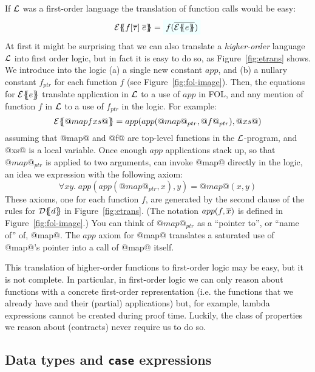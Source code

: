 If $\cal L$ was
a first-order language the translation of function calls would be easy:
$$
\etrans{\Sigma}{\Gamma}{f[\ol{\tau}]\;\ol{e}} = \formula{f(\ol{\etrans{}{}{e}})} \\
$$
At first it might be surprising that we can also translate a \emph{higher-order} language
$\cal L$ into first order logic, but in fact it is easy to do so, as
Figure~\ref{fig:etrans} shows.  We introduce into the logic
(a) a single new constant $app$, and (b) a nullary constant $f_{ptr}$ for each function $f$
(see Figure~\ref{fig:fol-image}).
Then, the equations for ${\cal E}\{\!\!\{e\}\!\!\}$ translate application in $\cal L$ to
a use of $app$ in FOL, and any mention of function $f$ in $\cal L$ to a use
of $f_{ptr}$ in the logic.  For example:
$$
{\cal E}\{\!\!\{@map f xs@\}\!\!\} = app( app( @map@_{ptr}, @f@_{ptr}), @xs@)
$$
assuming that @map@ and @f@ are top-level functions in the $\cal L$-program, and
@xs@ is a local variable.  Once enough $app$ applications stack up, so that
$@map@_{ptr}$ is applied to two arguments, can invoke @map@ directly in the logic,
an idea we expression with the following axiom:
$$
\forall x y.\;app(app(@map@_{ptr}, x), y) = @map@(x,y)
$$
These axioms, one for each function $f$, are generated by the second
clause of the rules for ${\cal D}\{\!\!\{d\}\!\!\}$ in Figure~\ref{fig:etrans}.
(The notation $app(f,\overline{x})$ is defined in Figure~\ref{fig:fol-image}.)
You can think of $@map@_{ptr}$ as a ``pointer to'', or ``name of'' of, @map@.
The $app$ axiom for @map@ translates a saturated use of @map@'s pointer into
a call of @map@ itself.

This translation of higher-order functions to first-order logic may be
easy, but it is not complete. In particular, in first-order logic we
can only reason about functions with a concrete first-order
representation (i.e. the functions that we already have and their
(partial) applications) but, for example, lambda expressions cannot be
created during proof time. Luckily, the class of properties we reason
about (contracts) never require us to do so.

\subsection{Data types and {\tt case} expressions} \label{s:case-fol}

